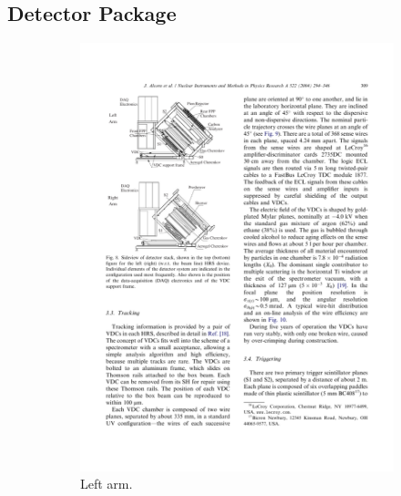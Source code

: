 \subsection{Detector Package}
\label{C5S4SS2}

\begin{figure}[b!]
  \centering
  \begin{subfigure}[t]{0.49\textwidth}
    \includegraphics[width=\textwidth]{figs/detector-package-left.pdf}
    \caption{Left arm. \label{C5S4SS2F1a}}
  \end{subfigure}
  \begin{subfigure}[t]{0.49\textwidth}

\end{subfigure}
\end{figure}
